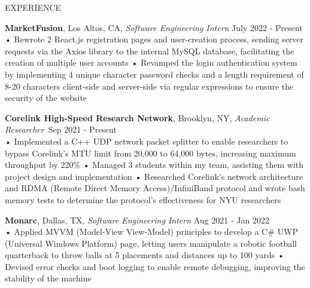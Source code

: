 \documentclass{resume} %
\begin{document}
\begin{rSection}{EXPERIENCE}

\textbf{MarketFusion}, Los Altos, CA, {\emph{Software Engineering Intern}} \hfill July 2022 - Present\\
• Rewrote 2 React.js registration pages and user-creation process, sending server requests via the Axios library to the internal MySQL database, facilitating the creation of multiple user accounts \newline
• Revamped the login authentication system by implementing 4 unique character password checks and a length requirement of 8-20 characters client-side and server-side via regular expressions to ensure the security of the website 

\textbf{Corelink High-Speed Research Network}, Brooklyn, NY, {\emph{Academic Researcher}}\ \hfill Sep 2021 - Present \\
• Implemented a C++ UDP network packet splitter to enable researchers to bypass Corelink's MTU limit from 20,000 to 64,000 bytes, increasing maximum throughput by 220\% \newline
• Managed 3 students within my team, assisting them with project design and implementation \newline
• Researched Corelink’s network architecture and RDMA (Remote Direct Memory Access)/InfiniBand protocol and wrote bash memory tests to determine the protocol's effectiveness for NYU researchers

\textbf{Monarc}, Dallas, TX, {\emph{Software Engineering Intern}} \hfill Aug 2021 - Jan 2022\\
• Applied MVVM (Model-View View-Model) principles to develop a C\# UWP (Universal Windows Platform) page, letting users manipulate a robotic football quarterback to throw balls at 5 placements and distances up to 100 yards \newline  %
• Devised error checks and boot logging to enable remote debugging, improving the stability of the machine \smallskip
\end{rSection} 
\end{document}
